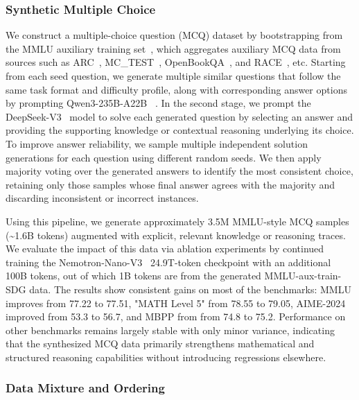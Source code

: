 \subsubsection{Synthetic Multiple Choice}

We construct a multiple-choice question (MCQ) dataset by bootstrapping from the MMLU auxiliary training set~\citep{hendryckstest2021}, which aggregates auxiliary MCQ data from sources such as ARC~\citep{allenai:arc}, MC\_TEST~\citep{richardson-etal-2013-mctest}, OpenBookQA~\citep{OpenBookQA2018}, and RACE~\citep{lai-etal-2017-race}, etc. Starting from each seed question, we generate multiple similar questions that follow the same task format and difficulty profile, along with corresponding answer options by prompting Qwen3-235B-A22B ~\citep{yang2025qwen3technicalreport}. In the second stage, we prompt the DeepSeek-V3~\citep{deepseekai2025deepseekv3technicalreport} model to solve each generated question by selecting an answer and providing the supporting knowledge or contextual reasoning underlying its choice. To improve answer reliability, we sample multiple independent solution generations for each question using different random seeds. We then apply majority voting over the generated answers to identify the most consistent choice, retaining only those samples whose final answer agrees with the majority and discarding inconsistent or incorrect instances.

Using this pipeline, we generate approximately 3.5M MMLU-style MCQ samples (\textasciitilde1.6B tokens) augmented with explicit, relevant knowledge or reasoning traces. We evaluate the impact of this data via ablation experiments by continued training the Nemotron-Nano-V3~\citep{nvidia2025nemotron3nanoopen} 24.9T-token checkpoint with an additional 100B tokens, out of which 1B tokens are from the generated MMLU-aux-train-SDG data. The results show consistent gains on most of the benchmarks: MMLU improves from 77.22 to 77.51, "MATH Level 5" from 78.55 to 79.05, AIME-2024 improved from 53.3 to 56.7, and MBPP from from 74.8 to 75.2. Performance on other benchmarks remains largely stable with only minor variance, indicating that the synthesized MCQ data primarily strengthens mathematical and structured reasoning capabilities without introducing regressions elsewhere.

\subsubsection{Data Mixture and Ordering}

